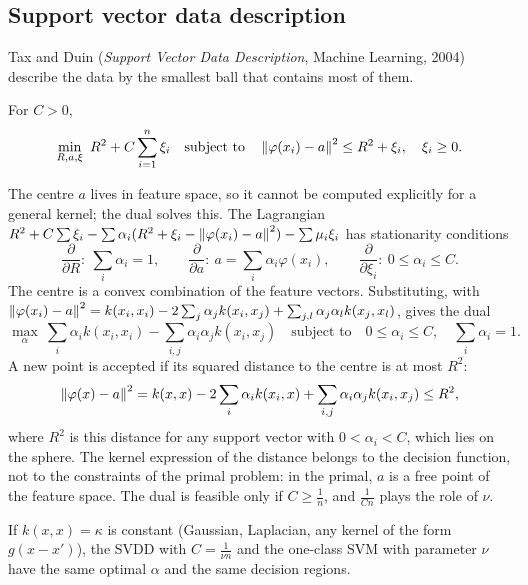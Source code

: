 \begin{notechapter}
\section{Support vector data description}\label{support-vector-methods:sec:svdd}

Tax and Duin (\emph{Support Vector Data Description}, Machine Learning, 2004) describe the data
by the smallest ball that contains most of them.

\begin{definition}
For $C>0$,
\[
  \min_{R, a, \xi}\ R^2 + C\sum_{i=1}^n\xi_i\quad\text{subject to}\quad\left\|\varphi(x_i) - a\right\|^2\leq R^2 + \xi_i,\quad\xi_i\geq0 .
\]
\end{definition}

The centre $a$ lives in feature space, so it cannot be computed explicitly for a general
kernel; the dual solves this. The Lagrangian
$R^2 + C\sum\xi_i - \sum\alpha_i(R^2 + \xi_i - \left\|\varphi(x_i) - a\right\|^2) - \sum\mu_i\xi_i$ has stationarity conditions
\[
  \frac{\partial}{\partial R}:\ \sum_i\alpha_i = 1,\qquad
  \frac{\partial}{\partial a}:\ a = \sum_i\alpha_i\varphi(x_i),\qquad
  \frac{\partial}{\partial\xi_i}:\ 0\leq\alpha_i\leq C .
\]
The centre is a convex combination of the feature vectors. Substituting, with
$\left\|\varphi(x_i) - a\right\|^2 = k(x_i, x_i) - 2\sum_j\alpha_jk(x_i, x_j) + \sum_{j,l}\alpha_j\alpha_lk(x_j, x_l)$, gives the dual
\[
  \max_\alpha\ \sum_i\alpha_ik(x_i, x_i) - \sum_{i,j}\alpha_i\alpha_jk(x_i, x_j)\quad\text{subject to}\quad0\leq\alpha_i\leq C,\quad\sum_i\alpha_i = 1 .
\]
A new point is accepted if its squared distance to the centre is at most $R^2$:
\[
  \left\|\varphi(x) - a\right\|^2 = k(x, x) - 2\sum_i\alpha_ik(x_i, x) + \sum_{i,j}\alpha_i\alpha_jk(x_i, x_j)\leq R^2,
\]
where $R^2$ is this distance for any support vector with $0<\alpha_i<C$, which lies on the sphere.
The kernel expression of the distance belongs to the decision function, not to the
constraints of the primal problem: in the primal, $a$ is a free point of the feature
space. The dual is feasible only if $C\geq\frac1n$, and $\frac1{Cn}$ plays the role of $\nu$.

\begin{proposition}\label{support-vector-methods:prop:equiv}
If $k(x, x) = \kappa$ is constant (Gaussian, Laplacian, any kernel of the form $g(x - x')$), the SVDD with
$C = \frac1{\nu n}$ and the one-class SVM with parameter $\nu$ have the same optimal $\alpha$ and the same
decision regions.
\end{proposition}


\end{notechapter}

